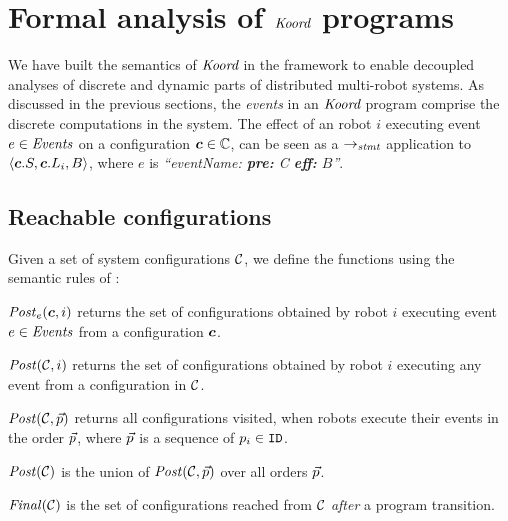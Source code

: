 
\section{Formal analysis of $\emph{Koord}$ programs}
\label{sec:verification}

\newcommand{\Ev}{\ensuremath{e}\xspace}
\newcommand{\EvBody}{\ensuremath{B}\xspace}


We have built the semantics of $\emph{Koord}$ in the \K framework to enable decoupled analyses of discrete and dynamic parts of distributed multi-robot systems.
As discussed in the previous sections, the \emph{events} in an $\emph{Koord}$ program comprise the discrete computations in the system.
The effect of an robot $i$ executing event $\Ev \in \Event$ on a configuration $\mathit{\boldsymbol{c}} \in \mathbb{C}$,
can be seen as a $\rightarrow_\mathit{stmt}$ application to  $\left\langle \gconfig.S, \gconfig.\lconfig{i}, \EvBody \right\rangle $, where $\Ev$ is \emph{``eventName: {\normalfont\bf pre:} C {\normalfont\bf eff:} \EvBody''}.

\subsection{Reachable configurations}

Given a set of system configurations $\mathcal{C}$, we define the functions using the semantic rules of :
\begin{inparaenum}[(i)]
    \item $\Post_\Ev(\gconfig,i)$ returns the set of configurations obtained by robot $i$ executing event $\Ev \in \Event$ from a configuration $\mathit{\boldsymbol{c}}$.
    \item $\mathit{Post}(\mathcal{C},i)$ returns the set of configurations obtained by robot $i$ executing any event from a configuration in $\mathcal{C}$.
    \item $\mathit{Post}(\mathcal{C},\vec{p})$ returns all configurations visited, when robots execute their events in the order $\vec{p}$,
          where $\vec{p}$ is a sequence of $p_i \in \texttt{ID}$.
    \item $\mathit{Post}(\mathcal{C})$ is the union of $\mathit{Post}(\mathcal{C},\vec{p})$ over all orders $\vec{p}$.
    \item $\mathit{Final}(\mathcal{C})$ is the set of configurations reached from $\mathcal{C}$ \emph{after} a program transition.
\end{inparaenum}

